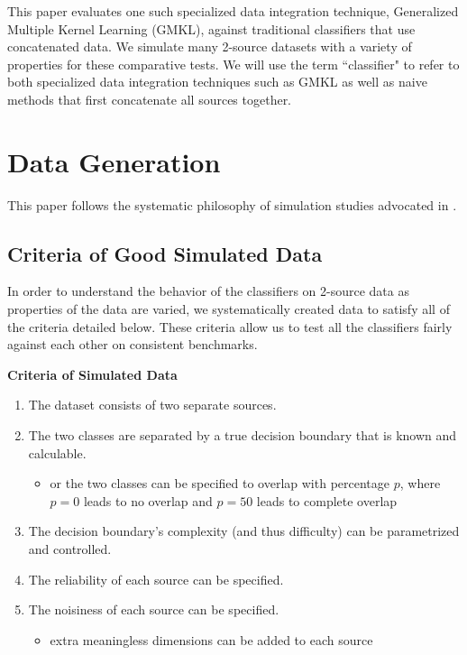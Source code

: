 \documentclass{article}
\begin{document}
This paper evaluates one such specialized data integration technique,
Generalized Multiple Kernel Learning (GMKL), against traditional classifiers that
use concatenated data. We simulate many 2-source datasets with a variety of
properties for these comparative tests. We will use the term ``classifier" to
refer to both specialized data integration techniques such as GMKL as well as
naive methods that first concatenate all sources together.












\section*{Data Generation}

This paper follows the systematic philosophy of simulation studies advocated in
\cite{neto2014simulation}.


\subsection*{Criteria of Good Simulated Data}

In order to understand the behavior of the classifiers on 2-source data as
properties of the data are varied, we systematically created data to satisfy
all of the criteria detailed below. These criteria allow us to test all
the classifiers fairly against each other on consistent benchmarks.
\newline

\begin{minipage}{\textwidth}
\centering
\textbf{Criteria of Simulated Data}
\begin{enumerate}
    \item The dataset consists of two separate sources.
    \item \label{itm:separable} The two classes are separated by a true
        decision boundary that is known and calculable.
    \begin{itemize}
        \item or the two classes can be specified to overlap with percentage
            $p$, where $p=0$ leads to no overlap and $p=50$ leads to complete
            overlap
    \end{itemize}
    \item The decision boundary's complexity (and thus difficulty) can be
        parametrized and controlled.
    \item The reliability of each source can be specified.
    \item The noisiness of each source can be specified.
    \begin{itemize}
        \item \label{itm:noisy} extra meaningless dimensions can be
            added to each source
    \end{itemize}
\end{enumerate}
\label{tab:criteria}
\end{minipage}
\end{document}
